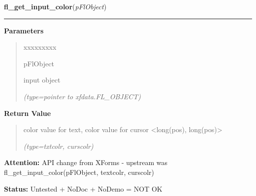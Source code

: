 \hspace{.8\funcindent}\begin{boxedminipage}{\funcwidth}

    \raggedright \textbf{fl\_get\_input\_color}(\textit{pFlObject})

    \vspace{-1.5ex}

    \rule{\textwidth}{0.5\fboxrule}
\setlength{\parskip}{2ex}
\setlength{\parskip}{1ex}
      \textbf{Parameters}
      \vspace{-1ex}

      \begin{quote}
        \begin{Ventry}{xxxxxxxxx}

          \item[pFlObject]

          input object

            {\it (type=pointer to xfdata.FL\_OBJECT)}

        \end{Ventry}

      \end{quote}

      \textbf{Return Value}
    \vspace{-1ex}

      \begin{quote}
      color value for text, color value for cursor {\textless}long(pos), 
      long(pos){\textgreater}

      {\it (type=txtcolr, curscolr)}

      \end{quote}

\textbf{Attention:} API change from XForms - upstream was fl\_get\_input\_color(pFlObject, 
textcolr, curscolr)



\textbf{Status:} Untested + NoDoc + NoDemo = NOT OK



    \end{boxedminipage}

    \label{xformslib:flinput:fl_set_input_scroll}

    \vspace{0.5ex}

